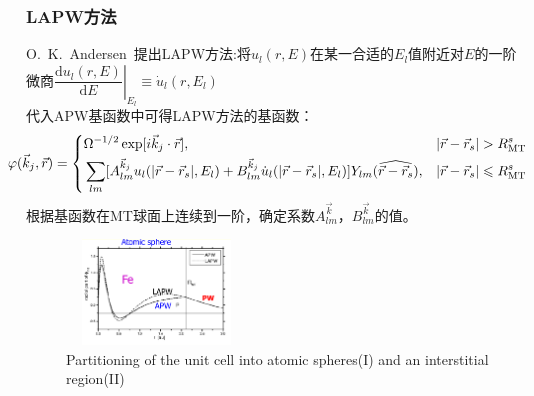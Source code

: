 {\frame
{
\frametitle{\textrm{LAPW}方法}
\textrm{O.~K.~Andersen~}提出\textrm{LAPW}方法:将$u_l(r,E)$在某一合适的$E_l$值附近对$E$的一阶微商{$\left.\dfrac{\textrm{d}u_l(r,E)}{\textrm{d}E}\right|_{E_l}\equiv\dot u_l(r,E_l)$}\\代入\textrm{APW}基函数中可得\textrm{LAPW}方法的基函数：
{\fontsize{7.5pt}{3.3pt}\selectfont
$$\hskip -14pt \varphi(\vec k_j,\vec r)=\left\{
  \begin{aligned}
    &\Omega^{-1/2}\exp[i\vec k_j\cdot\vec r],&|\vec r-\vec r_s|>R_{\mathrm{MT}}^s\\
    &\sum_{lm}[A^{\vec k_j}_{lm}u_l(|\vec r-\vec r_s|,E_l)+B^{\vec k_j}_{lm}\dot u_l(|\vec r-\vec r_s|,E_l)]Y_{lm}(\widehat{\vec r-\vec r_s}),&|\vec r-\vec r_s|\leqslant R_{\mathrm{MT}}^s
  \end{aligned}
\right.$$
根据基函数在\textrm{MT}球面上连续到一阶，确定系数$A^{\vec k}_{lm}$，$B^{\vec k}_{lm}$的值。}
\begin{figure}[h!]
	\vskip -3pt
\centering
\includegraphics[height=1.10in,width=1.88in,viewport=1 20 585 435,clip]{Figures/WIEN2k-LAPW.png}
\caption{\tiny \textrm{Partitioning of the unit cell into atomic spheres(I) and an interstitial region(II)}}%
\label{Muffin_tin-3}
\end{figure}
}

}
